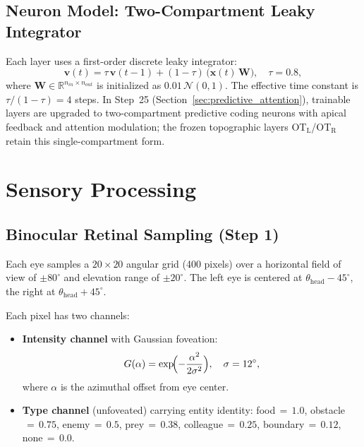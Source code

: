 \documentclass[11pt,a4paper]{article}
\begin{document}
\subsection{Neuron Model: Two-Compartment Leaky Integrator}

Each layer uses a first-order discrete leaky integrator:
\begin{equation}\label{eq:twocomp}
  \mathbf{v}(t) = \tau\,\mathbf{v}(t-1) + (1-\tau)\,\bigl(\mathbf{x}(t)\,\mathbf{W}\bigr),
  \quad \tau = 0.8,
\end{equation}
where $\mathbf{W} \in \mathbb{R}^{n_{in}\times n_{out}}$ is initialized as
$0.01\,\mathcal{N}(0,1)$.
The effective time constant is $\tau/(1-\tau)=4$ steps.
In Step~25 (Section~\ref{sec:predictive_attention}), trainable layers are
upgraded to two-compartment predictive coding neurons with apical feedback
and attention modulation; the frozen topographic layers
OT$_\text{L}$/OT$_\text{R}$ retain this single-compartment form.

\section{Sensory Processing}\label{sec:sensory}

\subsection{Binocular Retinal Sampling (Step 1)}

Each eye samples a $20\times 20$ angular grid (400 pixels) over a horizontal
field of view of $\pm 80^\circ$ and elevation range of $\pm 20^\circ$.
The left eye is centered at $\theta_{\text{head}} - 45^\circ$, the right at
$\theta_{\text{head}} + 45^\circ$.

Each pixel has two channels:
\begin{itemize}[nosep]
  \item \textbf{Intensity channel} with Gaussian foveation:
    \begin{equation}\label{eq:foveation}
      G(\alpha) = \exp\!\Bigl(-\frac{\alpha^2}{2\sigma^2}\Bigr),
      \quad \sigma = 12^\circ,
    \end{equation}
    where $\alpha$ is the azimuthal offset from eye center.
  \item \textbf{Type channel} (unfoveated) carrying entity identity:
    food$\,{=}\,1.0$, obstacle$\,{=}\,0.75$, enemy$\,{=}\,0.5$,
    prey$\,{=}\,0.38$, colleague$\,{=}\,0.25$,
    boundary$\,{=}\,0.12$, none$\,{=}\,0.0$.
\end{itemize}
\end{document}
